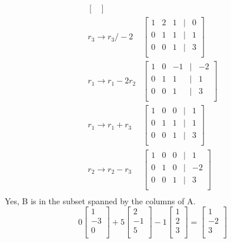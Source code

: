 \begin{prob}
\begin{align*}
\begin{bmatrix}
\end{bmatrix}\\
r_3\rightarrow r_3/-2&\begin{bmatrix}
   1 & 2 & 1 & | & 0\\
   0 & 1 & 1 & | & 1\\
   0 & 0 & 1 & | & 3\\
\end{bmatrix}\\
r_1\rightarrow r_1-2r_2&\begin{bmatrix}
   1 & 0 & -1 & | & -2\\
   0 & 1 & 1 & | & 1\\
   0 & 0 & 1 & | & 3\\
\end{bmatrix}\\
r_1\rightarrow r_1+r_3&\begin{bmatrix}
   1 & 0 & 0 & | & 1\\
   0 & 1 & 1 & | & 1\\
   0 & 0 & 1 & | & 3\\
\end{bmatrix}\\
r_2\rightarrow r_2-r_3&\begin{bmatrix}
   1 & 0 & 0 & | & 1\\
   0 & 1 & 0 & | & -2\\
   0 & 0 & 1 & | & 3\\
\end{bmatrix}\\
\end{align*}
Yes, B is in the subset spanned by the columns of A.
$$0\begin{bmatrix}
   1 \\
   -3 \\
   0 \\
\end{bmatrix}+5\begin{bmatrix}
   2 \\
   -1 \\
   5 \\
\end{bmatrix}-1\begin{bmatrix}
   1 \\
   2 \\
   3 \\
\end{bmatrix}=\begin{bmatrix}
   1 \\
   -2 \\
   3 \\
\end{bmatrix}$$
\end{prob}

